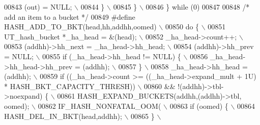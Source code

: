 \begin{DoxyCode}
{{{{{{{{00843 \textcolor{preprocessor}{      (out) = NULL;                                                              \(\backslash\)}
00844 \textcolor{preprocessor}{    \}                                                                            \(\backslash\)}
00845 \textcolor{preprocessor}{  \}                                                                              \(\backslash\)}
00846 \textcolor{preprocessor}{\} while (0)}
00847 
00848 \textcolor{comment}{/* add an item to a bucket  */}
00849 \textcolor{preprocessor}{#define HASH\_ADD\_TO\_BKT(head,hh,addhh,oomed)                                     \(\backslash\)}
00850 \textcolor{preprocessor}{do \{                                                                             \(\backslash\)}
00851 \textcolor{preprocessor}{  UT\_hash\_bucket *\_ha\_head = &(head);                                            \(\backslash\)}
00852 \textcolor{preprocessor}{  \_ha\_head->count++;                                                             \(\backslash\)}
00853 \textcolor{preprocessor}{  (addhh)->hh\_next = \_ha\_head->hh\_head;                                          \(\backslash\)}
00854 \textcolor{preprocessor}{  (addhh)->hh\_prev = NULL;                                                       \(\backslash\)}
00855 \textcolor{preprocessor}{  if (\_ha\_head->hh\_head != NULL) \{                                               \(\backslash\)}
00856 \textcolor{preprocessor}{    \_ha\_head->hh\_head->hh\_prev = (addhh);                                        \(\backslash\)}
00857 \textcolor{preprocessor}{  \}                                                                              \(\backslash\)}
00858 \textcolor{preprocessor}{  \_ha\_head->hh\_head = (addhh);                                                   \(\backslash\)}
00859 \textcolor{preprocessor}{  if ((\_ha\_head->count >= ((\_ha\_head->expand\_mult + 1U) * HASH\_BKT\_CAPACITY\_THRESH)) \(\backslash\)}
00860 \textcolor{preprocessor}{      && !(addhh)->tbl->noexpand) \{                                              \(\backslash\)}
00861 \textcolor{preprocessor}{    HASH\_EXPAND\_BUCKETS(addhh,(addhh)->tbl, oomed);                              \(\backslash\)}
00862 \textcolor{preprocessor}{    IF\_HASH\_NONFATAL\_OOM(                                                        \(\backslash\)}
00863 \textcolor{preprocessor}{      if (oomed) \{                                                               \(\backslash\)}
00864 \textcolor{preprocessor}{        HASH\_DEL\_IN\_BKT(head,addhh);                                             \(\backslash\)}
00865 \textcolor{preprocessor}{      \}                                                                          \(\backslash\)}
}}}}}}}}
\end{DoxyCode}
